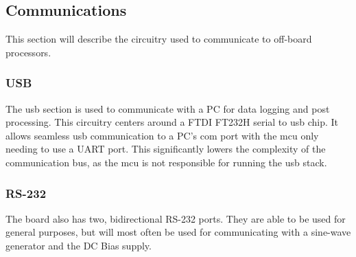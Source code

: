\subsection{Communications}

This section will describe the circuitry used to communicate to off-board processors.

\subsubsection{USB}
The \gls{usb} section is used to communicate with a PC for data logging and post processing. This circuitry centers around a FTDI FT232H serial to \gls{usb} chip. It allows seamless \gls{usb} communication to a PC's com port with the \gls{mcu} only needing to use a UART port. This significantly lowers the complexity of the communication bus, as the \gls{mcu} is not responsible for running the \gls{usb} stack.

\subsubsection{RS-232}
The board also has two, bidirectional RS-232 ports. They are able to be used for general purposes, but will most often be used for communicating with a sine-wave generator and the DC Bias supply.

